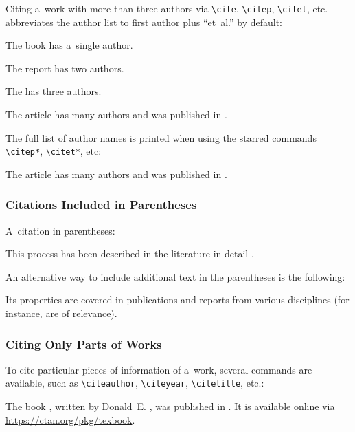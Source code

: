 \documentclass[12pt, a4paper, oneside]{article}
\theoremstyle{Plain}
\theoremstyle{Definition}
\theoremstyle{Remark}
\let \citeOrig \cite
\let \cite \textcite
\let \citealp \citeOrig
\begin{document}
Citing a~work with more than three authors via \verb|\cite|, \verb|\citep|, \verb|\citet|, etc. abbreviates the author list to first author plus ``et~al.'' by default:
\begin{tcolorbox}
	\setlength{\parindent}{0pt}%
	The book  \citep{gerhardt} has a~single author. \par
	The report  \citep{chiu} has two authors. \par
	The  \citep{companion} has three authors. \par
	The article  \citep{murray} has many authors and was published in \mkbibemph{}.
\end{tcolorbox}
The full list of author names is printed when using the starred commands \verb|\citep*|, \verb|\citet*|, etc:
\begin{tcolorbox}
	The article  \citep*{murray} has many authors and was published in \mkbibemph{}.
\end{tcolorbox}

\subsubsection{Citations Included in Parentheses}

A~citation in parentheses:
\begin{tcolorbox}
	This process has been described in the literature in detail \citep[see][and the references therein]{gerhardt}.
\end{tcolorbox}
An alternative way to include additional text in the parentheses is the following:
\begin{tcolorbox}
	Its properties are covered in publications and reports from various disciplines (for instance, \citealp{chiu, markey, padhye, sarfraz} are of relevance).
\end{tcolorbox}

\subsubsection{Citing Only Parts of Works}
To cite particular pieces of information of a~work, several commands are available, such as \verb|\citeauthor|, \verb|\citeyear|, \verb|\citetitle|, etc.:
\begin{tcolorbox}
	The book , written by Donald~E. \citeauthor{knuth:ct:a}, was published in \citeyear{knuth:ct:a}. It is available online via  \url{https://ctan.org/pkg/texbook}.%
	\vspace{-1pt}
\end{tcolorbox}
\end{document}
